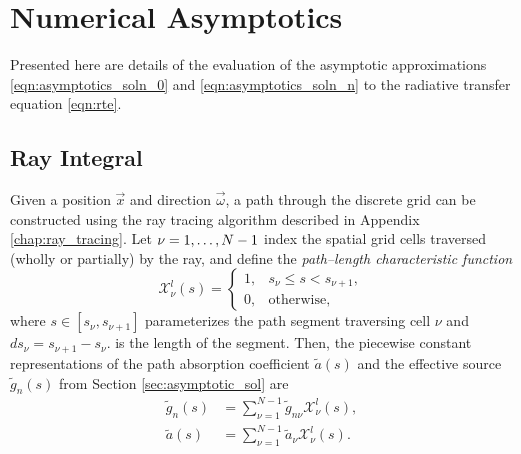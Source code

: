 \section{Numerical Asymptotics}
Presented here are details of the evaluation of the asymptotic approximations \eqref{eqn:asymptotics_soln_0} and \eqref{eqn:asymptotics_soln_n} to the radiative transfer equation \eqref{eqn:rte}.

\subsection{Ray Integral}
Given a position $\vec{x}$ and direction $\vec{\omega}$, a path through the discrete grid can be constructed using the ray tracing algorithm described in Appendix \ref{chap:ray_tracing}.
Let $\nu=1,\ldots,N\nobreak-\nobreak1$ index the spatial grid cells traversed (wholly or partially) by the ray, and define the \textit{path--length characteristic function}
\begin{equation*}
  \mathcal{X}^l_\nu(s) = \begin{cases}
    1, & s_\nu \leq s < s_{\nu+1}, \\
    0, & \mbox{otherwise},
    \end{cases}
\end{equation*}
where $s \in [s_\nu, s_{\nu+1}]$ parameterizes the path segment traversing cell $\nu$ and $ds_\nu = s_{\nu+1} - s_\nu.$ is the length of the segment.
Then, the piecewise constant representations of the path absorption coefficient $\tilde{a}(s)$ and the effective source $\tilde{g}_n(s)$ from Section \ref{sec:asymptotic_sol} are
\begin{align*}
  \tilde{g}_n(s) &= \sum_{\nu=1}^{N-1}\tilde{g}_{n\nu}\mathcal{X}^l_\nu(s), \\
  \tilde{a}(s) &= \sum_{\nu=1}^{N-1}\tilde{a}_{\nu}\mathcal{X}^l_\nu(s).
\end{align*}


